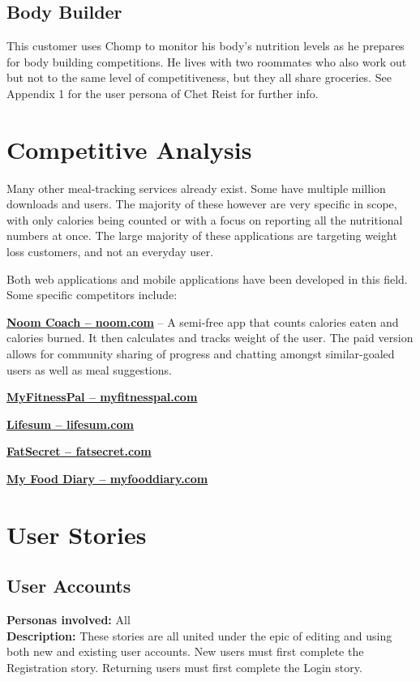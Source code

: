 \documentclass[a4paper,12pt]{article}
\begin{document}
\subsection{Body Builder}
This customer uses Chomp to monitor his body's nutrition levels as he prepares for body building competitions.  He lives with two roommates who also work out but not to the same level of competitiveness, but they all share groceries.  See Appendix 1 for the user persona of Chet Reist for further info.
\section{Competitive Analysis}
Many other meal-tracking services already exist.  Some have multiple million downloads and users.  The majority of these however are very specific in scope, with only calories being counted or with a focus on reporting all the nutritional numbers at once.  The large majority of these applications are targeting weight loss customers, and not an everyday user.

Both web applications and mobile applications have been developed in this field.  Some specific competitors include: \begin{list}{•}{•}
\item \textbf{\href{http://www.noom.com}{Noom Coach -- noom.com}} -- A semi-free app that counts calories eaten and calories burned.  It then calculates and tracks weight of the user.  The paid version allows for community sharing of progress and chatting amongst similar-goaled users as well as meal suggestions.
\item \textbf{\href{http://www.myfitnesspal.com}{MyFitnessPal -- myfitnesspal.com}}
\item \textbf{\href{http://www.lifesum.com}{Lifesum -- lifesum.com}}
\item \textbf{\href{http://www.fatsecret.com}{FatSecret -- fatsecret.com}}
\item \textbf{\href{http://www.myfooddiary.com}{My Food Diary -- myfooddiary.com}}
\end{list}
\section{User Stories}
\subsection{User Accounts}
\textbf{Personas involved:} All\\
\textbf{Description:} These stories are all united under the epic of editing and using both new and existing user accounts.  New users must first complete the Registration story.  Returning users must first complete the Login story.
\end{document}

